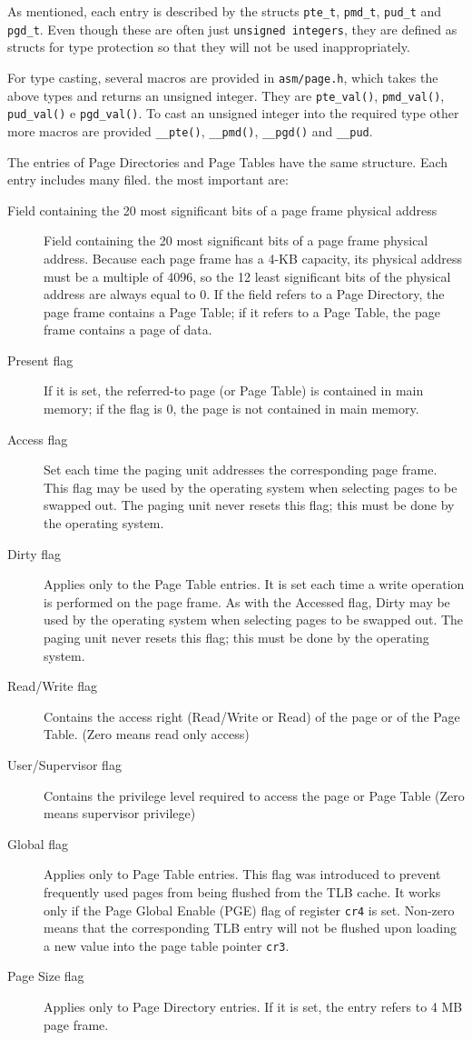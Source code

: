 \documentclass[10pt,a4paper]{article}
\begin{document}
As mentioned, each entry is described by the structs \texttt{pte\_t}, \texttt{pmd\_t}, \texttt{pud\_t} and \texttt{pgd\_t}. Even though these are often just \texttt{unsigned integers}, they are defined as structs for type protection so that they will not be used inappropriately.

For type casting, several macros are provided in \texttt{asm/page.h}, which takes the above types and returns an unsigned integer. They are \texttt{pte\_val()}, \texttt{pmd\_val()}, \texttt{pud\_val()} e \texttt{pgd\_val()}. To cast an unsigned integer into the required type other more macros are provided \texttt{\_\_pte()}, \texttt{\_\_pmd()}, \texttt{\_\_pgd()} and \texttt{\_\_pud}.


The entries of Page Directories and Page Tables have the same structure. Each entry includes many filed. the most important are:

\begin{description}
\item[Field containing the 20 most significant bits of a page frame physical address] Field containing the 20 most significant bits of a page frame physical address. Because each page frame has a 4-KB capacity, its physical address must be a multiple of 4096, so the 12 least significant bits of the physical address are always equal to 0. If the field refers to a Page Directory, the page frame contains a Page Table; if it refers to a Page Table, the page frame contains a page of data.
\item[Present flag] If it is set, the referred-to page (or Page Table) is contained in main memory; if the flag is 0, the page is not contained in main memory.
\item[Access flag] Set each time the paging unit addresses the corresponding page frame. This flag may be used by the operating system when selecting pages to be swapped out. The paging unit never resets this flag; this must be done by the operating system.
\item[Dirty flag] Applies only to the Page Table entries. It is set each time a write operation is performed on the page frame. As with the Accessed flag, Dirty may be used by the operating system when selecting pages to be swapped out. The paging unit never resets this flag; this must be done by the operating system.
\item[Read/Write flag] Contains the access right (Read/Write or Read) of the page or of the Page Table. (Zero means read only access)
\item[User/Supervisor flag] Contains the privilege level required to access the page or Page Table (Zero means supervisor privilege)
\item[Global flag] Applies only to Page Table entries. This flag was introduced to prevent frequently used pages from being flushed from the TLB cache. It works
only if the Page Global Enable (PGE) flag of register \texttt{cr4} is set. Non-zero means that the corresponding TLB entry will not be flushed upon loading a new value into the page table pointer \texttt{cr3}.
\item[Page Size flag] Applies only to Page Directory entries. If it is set, the entry refers to 4 MB page frame.
\end{description}
\end{document}
